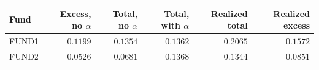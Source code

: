 \begin{tabular}{lrrrrr}
\toprule
Fund & Excess, no $\alpha$ & Total, no $\alpha$ & Total, with $\alpha$ & Realized total & Realized excess \\
\midrule
FUND1 & $0.1199$ & $0.1354$ & $0.1362$ & $0.2065$ & $0.1572$ \\
FUND2 & $0.0526$ & $0.0681$ & $0.1368$ & $0.1344$ & $0.0851$ \\
\bottomrule
\end{tabular}
